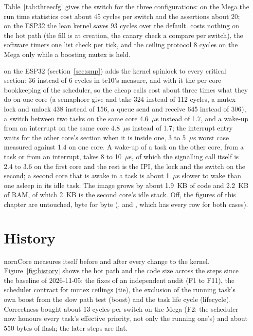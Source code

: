 Table~\ref{tab:threecfg} gives the switch for the three configurations: on the Mega the
run time statistics cost about 45 cycles per switch and the assertions about 20; on the
ESP32 the lean kernel saves 93 cycles over the default. 
costs nothing on the hot path (the fill is at creation, the canary check a compare per
switch), the software timers one list check per tick, and the ceiling protocol 8 cycles
on the Mega only while a boosting mutex is held.

 on the ESP32 (section~\ref{sec:smp}) adds the kernel spinlock to
every critical section: 36 instead of 6 cycles in tc10's measure, and with it the per
core bookkeeping of the scheduler, so the cheap calls cost about three times what they do
on one core (a semaphore give and take 324 instead of 112 cycles, a mutex lock and unlock
438 instead of 156, a queue send and receive 645 instead of 306), a switch between two
tasks on the same core 4.6~$\mu$s instead of 1.7, and a wake-up from an interrupt on the
same core 4.8~$\mu$s instead of 1.7; the interrupt entry waits for the other core's
section when it is inside one, 3 to 5~$\mu$s worst case measured against 1.4 on one
core. A wake-up of a task on the other core, from a task or from an interrupt, takes 8 to
10~$\mu$s, of which the signalling call itself is 2.4 to 3.6 on the first core and the
rest is the IPI, the lock and the switch on the second; a second core that is awake in a
task is about 1~$\mu$s slower to wake than one asleep in its idle task. The image grows
by about 1.9~KB of code and 2.2~KB of RAM, of which 2~KB is the second core's idle stack.
Off, the figures of this chapter are untouched, byte for byte
(,  and
, which has every row for both cases).

\section{History}

nornCore measures itself before and after every change to the kernel. Figure~\ref{fig:history}
shows the hot path and the code size across the steps since the baseline of
2026-11-05: the fixes of an independent audit (F1 to F11), the scheduler contract for
mutex ceilings (tie), the exclusion of the running task's own boost from the slow path
test (boost) and the task life cycle (lifecycle). Correctness bought about 13 cycles per
switch on the Mega (F2: the scheduler now honours every task's effective priority, not
only the running one's) and about 550 bytes of flash; the later steps are flat.

